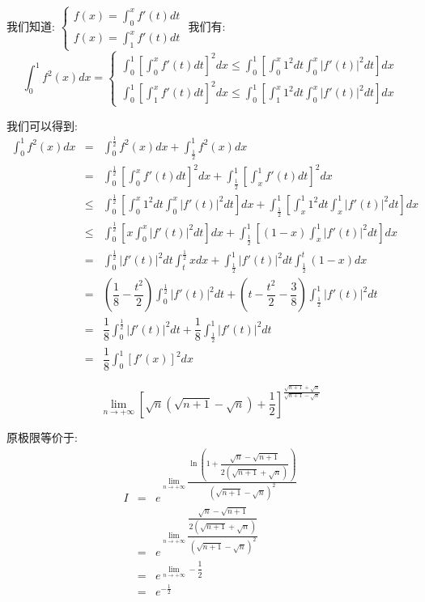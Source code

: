 \begin{solution}

	我们知道:  $\left\lbrace
	\begin{array}{l}
		f(x)=\int_{0}^{x}f'(t)dt\\
		f(x)=\int_{1}^{x}f'(t)dt
	\end{array}
	\right. $
	我们有:  $$\int_{0}^{1}f^{2}(x)dx=\left\lbrace
	\begin{array}{l}
		\int_{0}^{1}\left[\int_{0}^{x}f'(t)dt \right]^2dx\leq \int_{0}^{1}[\int_{0}^{x}1^2dt\int_{0}^{x}|f'(t)|^2dt]dx\\
		\int_{0}^{1}\left[\int_{1}^{x}f'(t)dt \right]^2dx\leq \int_{0}^{1}[\int_{1}^{x}1^2dt\int_{0}^{x}|f'(t)|^2dt]dx
	\end{array}
	\right.$$
	
	我们可以得到:  
	\begin{eqnarray*}
		\int_{0}^{1}f^{2}(x)dx&=&\int_{0}^{\frac{1}{2}}f^{2}(x)dx+\int_{\frac{1}{2}}^{1}f^{2}(x)dx\\
		&=&\int_{0}^{\frac{1}{2}}\left[\int_{0}^{x}f'(t)dt \right]^2dx+\int_{\frac{1}{2}}^{1}\left[\int_{x}^{1}f'(t)dt \right]^2dx\\
		&\leq&\int_{0}^{\frac{1}{2}}[\int_{0}^{x}1^2dt\int_{0}^{x}|f'(t)|^2dt]dx+\int_{\frac{1}{2}}^{1}[\int_{x}^{1}1^2dt\int_{x}^{1}|f'(t)|^2dt]dx\\
		&\leq&\int_{0}^{\frac{1}{2}}[x\int_{0}^{x}|f'(t)|^2dt]dx+\int_{\frac{1}{2}}^{1}[(1-x)\int_{x}^{1}|f'(t)|^2dt]dx\\
		&=&\int_{0}^{\frac{1}{2}}|f'(t)|^2dt\int_{t}^{\frac{1}{2}}xdx+\int_{\frac{1}{2}}^{1}|f'(t)|^2dt\int_{\frac{1}{2}}^{t}(1-x)dx\\
		&=&(\dfrac{1}{8}-\dfrac{t^2}{2})\int_{0}^{\frac{1}{2}}|f'(t)|^2dt+(t-\dfrac{t^2}{2}-\dfrac{3}{8})\int_{\frac{1}{2}}^{1}|f'(t)|^2dt\\
		&=&\dfrac{1}{8}\int_{0}^{\frac{1}{2}}|f'(t)|^2dt+\dfrac{1}{8}\int_{\frac{1}{2}}^{1}|f'(t)|^2dt\\
		&=&\dfrac{1}{8}\int_{0}^{1}[f'(x)]^2dx
	\end{eqnarray*}
\end{solution}

\begin{example}[][Exam: 34.2.4]
	$$\lim\limits_{n\to+\infty}\left[\sqrt{n}(\sqrt{n+1}-\sqrt{n})+\dfrac{1}{2} \right]^{\frac{\sqrt{n+1}+\sqrt{n}}{\sqrt{n+1}-\sqrt{n}}}$$
\end{example}
\begin{solution}

	原极限等价于:  
	\begin{eqnarray*}
		I&=&e^{\lim\limits_{n\to+\infty}\dfrac{\ln\left( 1+\dfrac{\sqrt{n}-\sqrt{n+1}}{2(\sqrt{n+1}+\sqrt{n})}\right)}{(\sqrt{n+1}-\sqrt{n})^2}}\\
		&=&e^{\lim\limits_{n\to+\infty}\dfrac{\dfrac{\sqrt{n}-\sqrt{n+1}}{2(\sqrt{n+1}+\sqrt{n})}}{(\sqrt{n+1}-\sqrt{n})^2}}\\
		&=&e^{\lim\limits_{n\to+\infty}-\dfrac{1}{2}}\\
		&=&e^{-\frac{1}{2}}
	\end{eqnarray*}
\end{solution}


